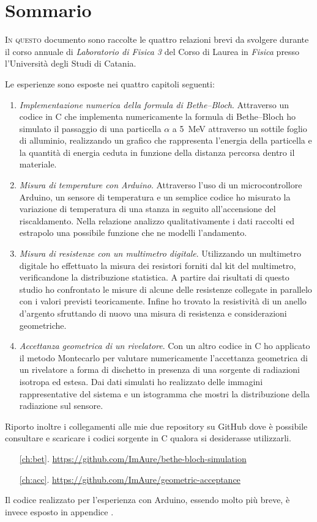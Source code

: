 \chapter{Sommario}
    \lettrine[loversize=0.08, lines=2]{I}{n questo} documento sono raccolte le quattro relazioni brevi da svolgere durante il corso annuale di \emph{Laboratorio di Fisica 3} del Corso di Laurea in \emph{Fisica} presso l'Università degli Studi di Catania.

    Le esperienze sono esposte nei quattro capitoli seguenti:
    \begin{enumerate}
        \item \emph{Implementazione numerica della formula di Bethe--Bloch}. Attraverso un codice in C che implementa numericamente la formula di Bethe--Bloch ho simulato il passaggio di una particella $\alpha$ a \SI{5}{\mega\eV} attraverso un sottile foglio di alluminio, realizzando un grafico che rappresenta l'energia della particella e la quantità di energia ceduta in funzione della distanza percorsa dentro il materiale.
        \item \emph{Misura di temperature con Arduino}. Attraverso l'uso di un microcontrollore Arduino, un sensore di temperatura e un semplice codice ho misurato la variazione di temperatura di una stanza in seguito all'accensione del riscaldamento. Nella relazione analizzo qualitativamente i dati raccolti ed estrapolo una possibile funzione che ne modelli l'andamento.
        \item \emph{Misura di resistenze con un multimetro digitale}. Utilizzando un multimetro digitale ho effettuato la misura dei resistori forniti dal kit del multimetro, verificandone la distribuzione statistica. A partire dai risultati di questo studio ho confrontato le misure di alcune delle resistenze collegate in parallelo con i valori previsti teoricamente. Infine ho trovato la resistività di un anello d'argento sfruttando di nuovo una misura di resistenza e considerazioni geometriche.
        \item \emph{Accettanza geometrica di un rivelatore}. Con un altro codice in C ho applicato il metodo Montecarlo per valutare numericamente l'accettanza geometrica di un rivelatore a forma di dischetto in presenza di una sorgente di radiazioni isotropa ed estesa. Dai dati simulati ho realizzato delle immagini rappresentative del sistema e un istogramma che mostri la distribuzione della radiazione sul sensore.
    \end{enumerate}
    
    Riporto inoltre i collegamenti alle mie due repository su GitHub dove è possibile consultare e scaricare i codici sorgente in C qualora si desiderasse utilizzarli.
    \begin{enumerate}
        \item[\ref{ch:bet}.] \url{https://github.com/ImAure/bethe-bloch-simulation}
        \item[\ref{ch:acc}.] \url{https://github.com/ImAure/geometric-acceptance}
    \end{enumerate}
    Il codice realizzato per l'esperienza con Arduino, essendo molto più breve, è invece esposto in appendice .